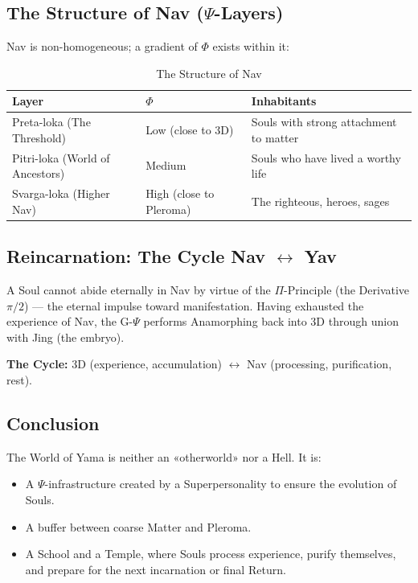 \documentclass[a4paper,12pt]{article}
\begin{document}
	\subsection{The Structure of Nav ($\Psi$-Layers)}
	
	Nav is non-homogeneous; a gradient of $\Phi$ exists within it:
	
	\begin{table}[H]
		\centering
		\begin{tabular}{|p{6cm}|p{3cm}|p{6cm}|}
			\hline
			\textbf{Layer} & \textbf{$\Phi$} & \textbf{Inhabitants} \\
			\hline
			Preta-loka (The Threshold) & Low (close to 3D) & Souls with strong attachment to matter \\
			\hline
			Pitri-loka (World of Ancestors) & Medium & Souls who have lived a worthy life \\
			\hline
			Svarga-loka (Higher Nav) & High (close to Pleroma) & The righteous, heroes, sages \\
			\hline
		\end{tabular}
		\caption{The Structure of Nav}
	\end{table}
	
	\subsection{Reincarnation: The Cycle Nav $\leftrightarrow$ Yav}
	
	A Soul cannot abide eternally in Nav by virtue of the $\Pi$-Principle (the Derivative $\pi/2$) — the eternal impulse toward manifestation. Having exhausted the experience of Nav, the G-$\Psi$ performs Anamorphing back into 3D through union with Jing (the embryo).
	
	\textbf{The Cycle:} 3D (experience, accumulation) $\leftrightarrow$ Nav (processing, purification, rest).
	
	\subsection{Conclusion}
	
	The World of Yama is neither an «otherworld» nor a Hell. It is:
	
	\begin{itemize}
		\item A $\Psi$-infrastructure created by a Superpersonality to ensure the evolution of Souls.
		\item A buffer between coarse Matter and Pleroma.
		\item A School and a Temple, where Souls process experience, purify themselves, and prepare for the next incarnation or final Return.
	\end{itemize}
	
\end{document}
